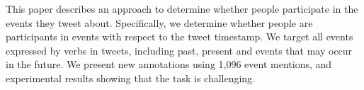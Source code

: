 This paper describes an approach to determine whether people participate in the events they tweet about. Specifically, we determine whether people are participants in events with respect to the tweet timestamp. We target all events expressed by verbs in tweets, including past, present and events that may occur in the future. We present new annotations using 1,096 event mentions, and experimental results showing that the task is challenging.
